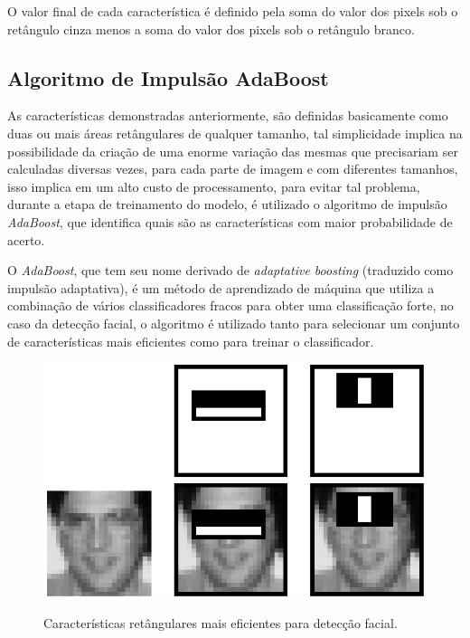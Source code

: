  O valor final de cada característica é definido pela soma do valor dos pixels sob o retângulo cinza menos a soma do valor dos pixels sob o retângulo branco.

\subsection{Algoritmo de Impulsão AdaBoost}

As características demonstradas anteriormente, são definidas basicamente como duas ou mais áreas retângulares de qualquer tamanho, tal simplicidade implica na possibilidade da criação de uma enorme variação das mesmas que precisariam ser calculadas diversas vezes, para cada parte de imagem e com diferentes tamanhos, isso implica em um alto custo de processamento, para evitar tal problema, durante a etapa de treinamento do modelo, é utilizado o algoritmo de impulsão \textit{AdaBoost}, que identifica quais são as características com maior probabilidade de acerto.

O \textit{AdaBoost}, que tem seu nome derivado de \textit{adaptative boosting} (traduzido como impulsão adaptativa), é um método de aprendizado de máquina que utiliza a combinação de vários classificadores fracos para obter uma classificação forte, no caso da detecção facial, o algoritmo é utilizado tanto para selecionar um conjunto de características mais eficientes como para treinar o classificador. \cite{fabio-luciana-2015}

\begin{figure}[htb]
    \centering
    \caption{Características retângulares mais eficientes para detecção facial.}
    \includegraphics[scale=.3]{figs/top-features.png}
    \label{fig:top-features}
 \end{figure}

